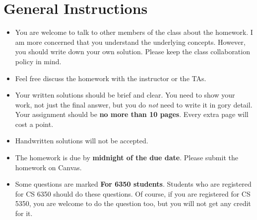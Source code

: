 \section*{General Instructions}

{\footnotesize
  \begin{itemize}
  \item You are welcome to talk to other members of the class about
    the homework. I am more concerned that you understand the
    underlying concepts. However, you should write down your own
    solution. Please keep the class collaboration policy in mind.

  \item Feel free discuss the homework with the instructor or the TAs.

  \item Your written solutions should be brief and clear. You need to
    show your work, not just the final answer, but you do \emph{not}
    need to write it in gory detail. Your assignment should be {\bf no
      more than 10 pages}. Every extra page will cost a point.

  \item Handwritten solutions will not be accepted.

  \item The homework is due by \textbf{midnight of the due date}. Please submit
    the homework on Canvas.

  \item Some questions are marked {\bf For 6350 students}. Students
    who are registered for CS 6350 should do these questions. Of
    course, if you are registered for CS 5350, you are welcome to do
    the question too, but you will not get any credit for it.

  \end{itemize}
}

